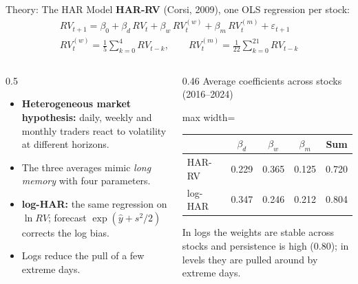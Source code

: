 \documentclass[aspectratio=169, 10pt]{beamer}
\begin{document}
\begin{frame}{Theory: The HAR Model}
    \textbf{HAR-RV} (Corsi, 2009), one OLS regression per stock:
    \begin{gather*}
    RV_{t+1} = \beta_0 + \beta_d\,RV_t + \beta_w\,RV_t^{(w)} + \beta_m\,RV_t^{(m)} + \varepsilon_{t+1}\\
    RV_t^{(w)} = \tfrac{1}{5}\textstyle\sum_{k=0}^{4} RV_{t-k}, \qquad RV_t^{(m)} = \tfrac{1}{22}\sum_{k=0}^{21} RV_{t-k}
    \end{gather*}
    \begin{columns}[T]
        \begin{column}{0.5\textwidth}
            \small
            \begin{itemize}
                \item \textbf{Heterogeneous market hypothesis:} daily, weekly and monthly traders react to volatility at different horizons.
                \item The three averages mimic \emph{long memory} with four parameters.
                \item \textbf{log-HAR:} the same regression on $\ln RV$; forecast $\exp(\hat y + s^2/2)$ corrects the log bias.
                \item Logs reduce the pull of a few extreme days.
            \end{itemize}
        \end{column}
        \begin{column}{0.46\textwidth}
            \centering
            \small Average coefficients across stocks (2016--2024)
            \vspace{0.1cm}

            \begin{adjustbox}{max width=\linewidth}\begin{tabular}{lcccc}
                \toprule
                & $\beta_d$ & $\beta_w$ & $\beta_m$ & Sum \\
                \midrule
                HAR-RV  & 0.229 & 0.365 & 0.125 & 0.720 \\
                log-HAR & 0.347 & 0.246 & 0.212 & 0.804 \\
                \bottomrule
            \end{tabular}\end{adjustbox}

            \vspace{0.15cm}
            \raggedright\footnotesize In logs the weights are stable across stocks and persistence is high (0.80); in levels they are pulled around by extreme days.
        \end{column}
    \end{columns}
\end{frame}
\end{document}
